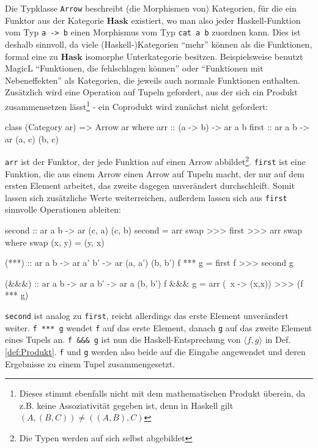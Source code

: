\documentclass[a4paper, bibgerm]{article}
\newcommand\icode[1]{\lstinline?#1?}
\newcommand{\dref}[1]{Def. \ref{def:#1}}
\begin{document}
Die Typklasse \icode{Arrow} beschreibt (die Morphismen von) Kategorien,
für die ein Funktor aus der Kategorie $\mathbf{Hask}$ existiert, wo man
also jeder Haskell-Funktion vom Typ \icode{a -> b} einen Morphismus vom
Typ \icode{cat a b} zuordnen kann. Dies ist deshalb sinnvoll, da viele
(Haskell-)Kategorien "`mehr"' können als die Funktionen, formal eine zu
$\mathbf{Hask}$ isomorphe Unterkategorie besitzen. Beispielsweise
benutzt MagicL "`Funktionen, die fehlschlagen können"' oder "`Funktionen
mit Nebeneffekten"' als Kategorien, die jeweils auch normale Funktionen
enthalten. Zusätzlich wird eine Operation auf Tupeln gefordert, aus der
sich ein Produkt zusammensetzen lässt\footnote{Dieses stimmt ebenfalls
  nicht mit dem mathematischen Produkt überein, da z.B. keine
  Assoziativität gegeben ist, denn in Haskell gilt $(A, (B, C)) \neq
  ((A, B), C)$} - ein Coprodukt wird zunächst nicht gefordert:
\begin{code}
class (Category ar) => Arrow ar where
  arr   :: (a -> b) -> ar a b
  first :: ar a b  -> ar (a, c) (b, c)
\end{code}
\icode{arr} ist der Funktor, der jede Funktion auf einen Arrow
abbildet\footnote{Die Typen werden auf sich selbst abgebildet}.
\icode{first} ist eine Funktion, die aus einem Arrow einen Arrow auf
Tupeln macht, der nur auf dem ersten Element arbeitet, das zweite
dagegen unverändert durchschleift. Somit lassen sich zusätzliche Werte
weiterreichen, außerdem lassen sich aus \icode{first} sinnvolle
Operationen ableiten:

\begin{code}
  second :: ar a b -> ar (c, a) (c, b)
  second = arr swap >>> first >>> arr swap
    where swap (x, y) = (y, x)

  (***) :: ar a b -> ar a' b' -> ar (a, a') (b, b')
  f *** g = first f >>> second g

  (&&&) :: ar a b -> ar a b' -> ar a (b, b')
  f &&& g = arr (\ x -> (x,x)) >>> (f *** g)
\end{code}

\icode{second} ist analog zu \icode{first}, reicht allerdings das erste
Element unverändert weiter. \icode{f *** g} wendet \icode{f} auf das
erste Element, danach \icode{g} auf das zweite Element eines Tupels
an. \icode{f &&& g} ist nun die Haskell-Entsprechung von $\langle f,g
\rangle$ in \dref{Produkt}. \icode{f} und \icode{g} werden also beide
auf die Eingabe angewendet und deren Ergebnisse zu einem Tupel
zusammengesetzt.
\end{document}
